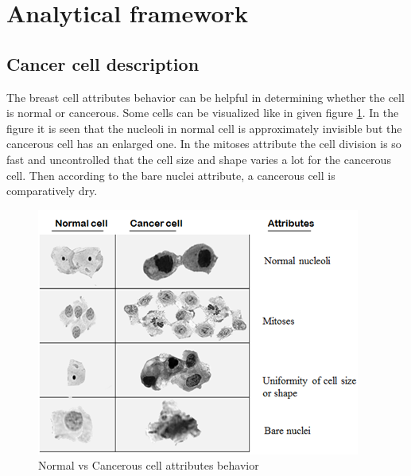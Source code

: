 \documentclass[conference]{IEEEtran}
\begin{document}
\section{Analytical framework}
\subsection{Cancer cell description}

The breast cell attributes behavior can be helpful in determining whether the cell is normal or cancerous. Some cells can be visualized like in given figure \ref{fig_attri}. In the figure it is seen that the nucleoli in normal cell is approximately invisible but the cancerous cell has an enlarged one. In the mitoses attribute the cell division is so fast and uncontrolled that the cell size and shape varies a lot for the cancerous cell. Then according to the bare nuclei attribute, a cancerous cell is comparatively dry.  

\begin{figure}[!h]
\centering
\includegraphics[scale=0.9]{attributesnew}
\caption{Normal vs Cancerous cell attributes behavior}
\label{fig_attri}
\end{figure}
\end{document}
